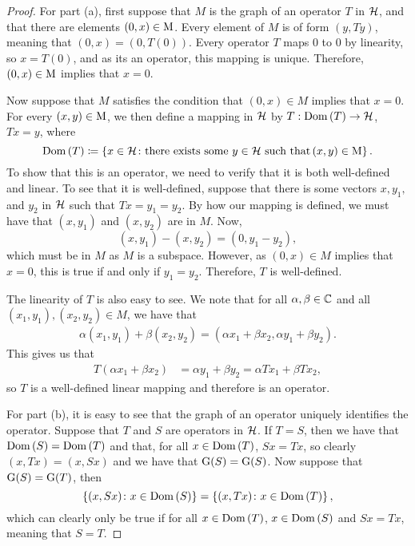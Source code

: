\begin{proof}
  For part (a), first suppose that $M$ is the graph of an operator $T$ in $\mathcal{H}$, and that there are elements $(0, x) \in \mathrm{M}$. Every element of $M$ is of form $(y, Ty)$, meaning that $(0, x) = (0, T(0))$. Every operator $T$ maps 0 to 0 by linearity, so $x = T(0)$, and as its an operator, this mapping is unique. Therefore, $(0, x) \in \mathrm{M}$ implies that $x = 0$.

  \medskip

  Now suppose that $M$ satisfies the condition that $(0, x) \in M$ implies that $x = 0$. For every $(x, y) \in \mathrm{M}$, we then define a mapping in $\mathcal{H}$ by $T: \operatorname{Dom}\left(T\right) \to \mathcal{H}$, $Tx = y$, where
  \begin{equation*}
    \operatorname{Dom}\left(T\right) \coloneqq \left\{x \in \mathcal{H} \colon \text{there exists some $y \in \mathcal{H}$ such that} \,(x, y) \in \mathrm{M}\right\}.
  \end{equation*}
  To show that this is an operator, we need to verify that it is both well-defined and linear. To see that it is well-defined, suppose that there is some vectors $x, y_1,$ and $y_2$ in $\mathcal{H}$ such that $Tx = y_1 = y_2$. By how our mapping is defined, we must have that $(x, y_1)$ and $(x, y_2)$ are in $M$. Now,
  \begin{equation*}
    (x, y_1) - (x, y_2) = (0, y_1 - y_2),
  \end{equation*}
  which must be in $M$ as $M$ is a subspace. However, as $(0, x) \in M$ implies that $x = 0$, this is true if and only if $y_1 = y_2$. Therefore, $T$ is well-defined.

  \medskip

  The linearity of $T$ is also easy to see. We note that for all $\alpha, \beta \in \mathbb{C}$ and all $(x_1, y_1), (x_2, y_2) \in M$, we have that
  \begin{align*}
    \alpha (x_1, y_1) + \beta (x_2, y_2)
    =
    (\alpha x_1 + \beta x_2, \alpha y_1 + \beta y_2).
  \end{align*}
  This gives us that
  \begin{align*}
    T(\alpha x_1 + \beta x_2)
    &=
    \alpha y_1 + \beta y_2
    =
    \alpha Tx_1 + \beta Tx_2,
  \end{align*}
  so $T$ is a well-defined linear mapping and therefore is an operator.

  \medskip

  For part (b), it is easy to see that the graph of an operator uniquely identifies the operator. Suppose that $T$ and $S$ are operators in $\mathcal{H}$. If $T = S$, then we have that $\operatorname{Dom}\left(S\right) = \operatorname{Dom}\left(T\right)$ and that, for all $x \in \operatorname{Dom}\left(T\right)$, $Sx = Tx$, so clearly $(x, Tx) = (x, Sx)$ and we have that $\operatorname{G}(S) = \operatorname{G}(S)$. Now suppose that $\operatorname{G}(S) = \operatorname{G}(T)$, then
  \begin{equation*}
    \left\{(x, Sx) \colon x \in \operatorname{Dom}\left(S\right)\right\} = \left\{(x, Tx) \colon x \in \operatorname{Dom}\left(T\right)\right\},
  \end{equation*}
  which can clearly only be true if for all $x \in \operatorname{Dom}\left(T\right)$, $x \in \operatorname{Dom}\left(S\right)$ and $Sx = Tx$, meaning that $S = T$.
\end{proof}


